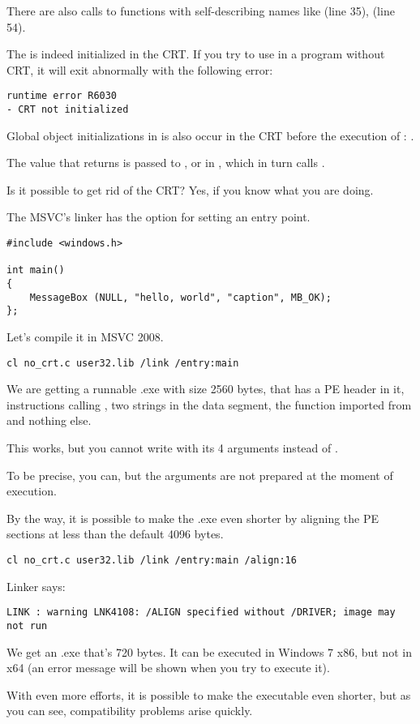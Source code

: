 There are also calls to functions
with self-describing names like  (line 35),  (line 54).

The  is indeed initialized in the \ac{CRT}.
If you try to use  in a program without CRT, it will exit abnormally with the following error:

\begin{lstlisting}
runtime error R6030
- CRT not initialized
\end{lstlisting}

Global object initializations in \Cpp is also occur in the \ac{CRT} before the execution of \main{}: 
.

The value that \main{} returns is passed to , 
or in , which in turn calls .

Is it possible to get rid of the \ac{CRT}?
Yes, if you know what you are doing.

The \ac{MSVC}'s linker has the  option for setting an entry point.

\begin{lstlisting}[style=customc]
#include <windows.h>

int main()
{
	MessageBox (NULL, "hello, world", "caption", MB_OK);
};
\end{lstlisting}

Let's compile it in MSVC 2008.

\begin{lstlisting}
cl no_crt.c user32.lib /link /entry:main
\end{lstlisting}

We are getting a runnable .exe with size 2560 bytes, that has a PE header in it, instructions 
calling , two strings in the data segment,
the  function imported from  and nothing else.

This works, but you cannot write  with its 4 arguments instead of \main{}.

To be precise, you can, but the arguments are not prepared at the moment of execution.

By the way, it is possible to make the .exe even 
shorter by aligning the \ac{PE} sections at less than the default 4096 bytes.

\begin{lstlisting}
cl no_crt.c user32.lib /link /entry:main /align:16
\end{lstlisting}

Linker says:

\begin{lstlisting}
LINK : warning LNK4108: /ALIGN specified without /DRIVER; image may not run
\end{lstlisting}

We get an .exe that's 720 bytes.
It can be executed in Windows 7 x86, but not in x64 
(an error message will be shown when you try to execute it).

With even more efforts, it is possible
to make the executable even shorter, but as you can see, compatibility problems arise quickly.
